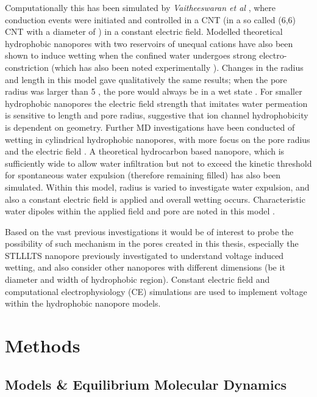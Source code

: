 Computationally this has been simulated by \textit{Vaitheeswaran et al} \cite{Vaitheeswaran2004f}, where conduction events were initiated and controlled in a CNT  (in a so called (6,6) CNT with a diameter of  \angstrom) in a constant electric field. Modelled theoretical hydrophobic nanopores  with two reservoirs of unequal cations have also been shown to induce wetting when the confined water undergoes strong electro-constriction \cite{Dzubiella2003x} (which has also been noted experimentally \cite{Toney1994}). Changes in the radius and length in this model gave qualitatively the same results; when the pore radius was larger than 5 \angstrom, the pore would always be in a wet state \cite{Allen2003g}. For smaller hydrophobic nanopores the electric field strength that imitates water permeation is sensitive to length and pore radius, suggestive that ion channel hydrophobicity is dependent on geometry. Further MD investigations have been conducted of wetting in cylindrical hydrophobic nanopores, with more focus on the pore radius and the electric field \cite{Dzubiella2005}. A theoretical hydrocarbon based nanopore, which is sufficiently wide to allow water infiltration but not to exceed the kinetic threshold for spontaneous water expulsion (therefore remaining filled) has also been simulated. Within this model, radius is varied to investigate water expulsion, and also a constant electric field is applied and overall wetting occurs. Characteristic water dipoles within the applied field and pore are noted in this model \cite{Vanzo2015x}.

Based on the vast previous investigations it would be of interest to probe the possibility of such mechanism in the pores created in this thesis, especially the STLLLTS nanopore previously investigated to understand voltage induced wetting, and also consider other nanopores with different  dimensions (be it diameter and width of hydrophobic region). Constant electric field and computational electrophysiology (CE) simulations are used to implement voltage within the hydrophobic nanopore models. 

\section{Methods}

\subsection{Models \& Equilibrium Molecular Dynamics}

